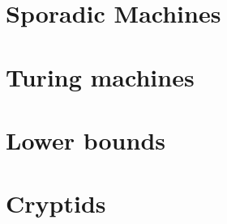 \documentclass[a4paper,british]{article}
\theoremstyle{definition} %
\numberwithin{equation}{section}
\theoremstyle{definition} %
\begin{document}
\section{Sporadic Machines}\label{sec:sporadic}





\newpage


\appendix

\section{Turing machines}\label{app:TMs}
\section{Lower bounds}\label{app:lowerbounds}
\section{Cryptids}\label{app:cryptids}
\end{document}
